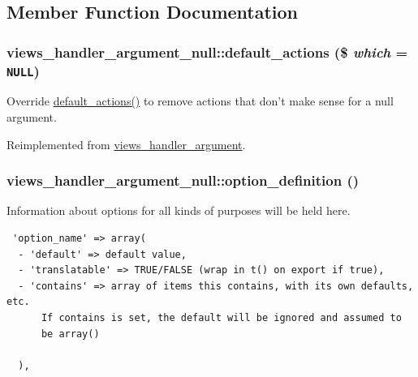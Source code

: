 \subsection{Member Function Documentation}
\hypertarget{classviews__handler__argument__null_82da8fd1448e1ce346aa38d5b6021e05}{
\subsubsection[{default\_\-actions}]{\setlength{\rightskip}{0pt plus 5cm}views\_\-handler\_\-argument\_\-null::default\_\-actions (\$ {\em which} = {\tt NULL})}}
\label{classviews__handler__argument__null_82da8fd1448e1ce346aa38d5b6021e05}


Override \hyperlink{classviews__handler__argument__null_82da8fd1448e1ce346aa38d5b6021e05}{default\_\-actions()} to remove actions that don't make sense for a null argument. 

Reimplemented from \hyperlink{classviews__handler__argument_bf38ef334b6e18e0aa43e5a829e3ce33}{views\_\-handler\_\-argument}.\hypertarget{classviews__handler__argument__null_8ba4c40627657d548ad011a1e203d00f}{
\subsubsection[{option\_\-definition}]{\setlength{\rightskip}{0pt plus 5cm}views\_\-handler\_\-argument\_\-null::option\_\-definition ()}}
\label{classviews__handler__argument__null_8ba4c40627657d548ad011a1e203d00f}


Information about options for all kinds of purposes will be held here. 

\begin{Code}\begin{verbatim} 'option_name' => array(
  - 'default' => default value,
  - 'translatable' => TRUE/FALSE (wrap in t() on export if true),
  - 'contains' => array of items this contains, with its own defaults, etc.
      If contains is set, the default will be ignored and assumed to
      be array()

  ),
\end{verbatim}
\end{Code}

